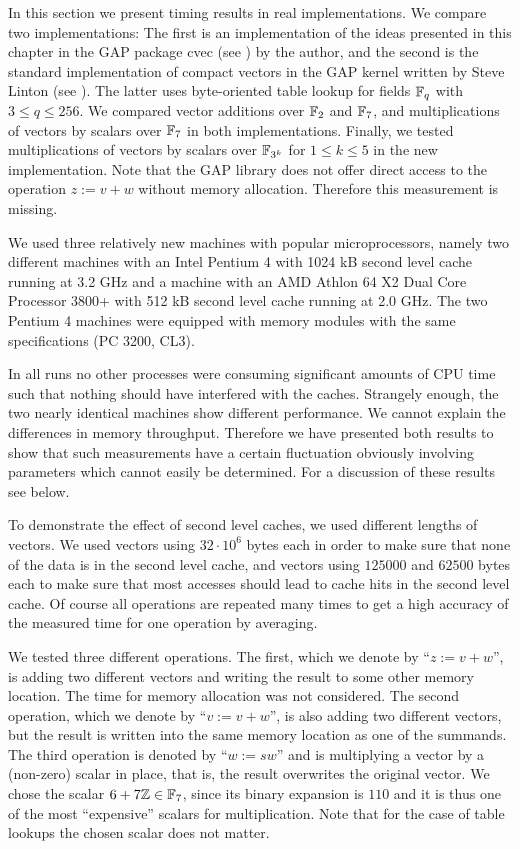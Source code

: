 In this section we present timing results in real implementations. We 
compare two implementations: The first is an implementation of the
ideas presented in this chapter in the {\sf GAP} package {\sf cvec}
(see \cite{cvec}) by the author, and the second is the standard implementation
of compact vectors in the {\sf GAP} kernel written by Steve Linton
(see \cite{GAP4}).
The latter uses byte-oriented table lookup for fields $\mathbb{F}_q$ with 
$3 \le q \le 256$. We compared vector additions over $\mathbb{F}_2$ and $\mathbb{F}_7$, 
and multiplications of vectors by scalars over $\mathbb{F}_7$ in both implementations.
Finally, we tested multiplications of vectors by scalars over $\mathbb{F}_{3^k}$
for $1 \le k \le 5$ in the new implementation.
Note that the {\sf GAP} library does not offer direct access to the
operation $z := v+w$ without memory allocation. Therefore this 
measurement is missing.

We used three relatively new machines with popular microprocessors, 
namely two different machines
with an Intel Pentium 4 with 1024 kB second level cache running at 3.2 GHz 
and a machine with an AMD Athlon 64 X2 Dual Core Processor 3800+ with 512 kB
second level cache running at 2.0 GHz. The two Pentium 4 machines were
equipped with memory modules with the same specifications (PC 3200, CL3). 

In all runs no other processes
were consuming significant amounts of CPU time such that nothing should
have interfered with the caches. Strangely enough, the two nearly identical
machines show different performance. 
We cannot explain the differences in memory throughput.
Therefore we have presented both
results to show that such measurements have a certain fluctuation
obviously involving parameters which cannot easily be determined.
For a discussion of these results see below.

To demonstrate the effect of second level caches, we used different 
%
lengths of vectors. We used vectors using $32 \cdot 10^6$ bytes each in
order to make sure that none of the data is in the second level cache,
and vectors using $125000$ and $62500$ bytes each to make sure that
most accesses should lead to cache hits in the second level cache.
Of course all operations are repeated many times to get a high accuracy
of the measured time for one operation by averaging.

We tested three different operations. The first, which we denote by 
``$z := v+w$'', is adding two different vectors and writing the
result to some other memory location. The time for memory allocation
was not considered. The second operation, which we denote by 
``$v := v+w$'', is also adding two different vectors, but the result
is written into the same memory location as one of the summands.
The third operation is denoted by ``$w := sw$'' and is multiplying
a vector by a (non-zero) scalar in place, that is, the result overwrites
the original vector. We chose the scalar $6 + 7\mathbb{Z} \in \mathbb{F}_7$, since its
binary expansion is $110$ and it is thus one of the most ``expensive'' scalars
for multiplication. Note that for the case of table lookups the chosen
scalar does not matter.

